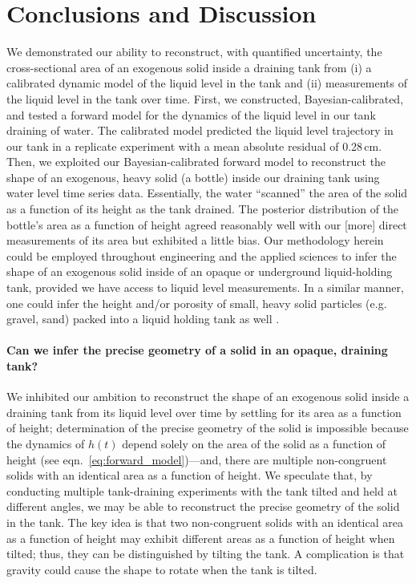 \documentclass[openacc]{rsproca_new}%
\begin{document}
\section{Conclusions and Discussion}
We demonstrated our ability to reconstruct, with quantified uncertainty, the cross-sectional area of an exogenous solid inside a draining tank from (i) a calibrated dynamic model of the liquid level in the tank and (ii) measurements of the liquid level in the tank over time.
First, we constructed, Bayesian-calibrated, and tested a forward model for the dynamics of the liquid level in our tank draining of water.
The calibrated model predicted the liquid level trajectory in our tank in a replicate experiment with a mean absolute residual of 0.28\,cm.
Then, we exploited our Bayesian-calibrated forward model to reconstruct the shape of an exogenous, heavy solid (a bottle) inside our draining tank using water level time series data. 
Essentially, the water ``scanned'' the area of the solid as a function of its height as the tank drained. 
The posterior distribution of the bottle's area as a function of height agreed reasonably well with our [more] direct measurements of its area but exhibited a little bias. 
Our methodology herein could be employed throughout engineering and the applied sciences to infer the shape of an exogenous solid inside of an opaque or underground \cite{gephart2010short} liquid-holding tank, provided we have access to liquid level measurements.
In a similar manner, one could infer the height and/or porosity of small, heavy solid particles (e.g. gravel, sand) packed into a liquid holding tank as well \cite{guellouz2020estimation}.

\paragraph{Can we infer the precise geometry of a solid in an opaque, draining tank?}
We inhibited our ambition to reconstruct the shape of an exogenous solid inside a draining tank from its liquid level over time by settling for its area as a function of height; determination of the precise geometry of the solid is impossible because the dynamics of $h(t)$ depend solely on the area of the solid as a function of height (see eqn.~\ref{eq:forward_model})---and, there are multiple non-congruent solids with an identical area as a function of height. We speculate that, by conducting multiple tank-draining experiments with the tank tilted and held at different angles, we may be able to reconstruct the precise geometry of the solid in the tank. The key idea is that two non-congruent solids with an identical area as a function of height may exhibit different areas as a function of height when tilted; thus, they can be distinguished by tilting the tank. A complication is that gravity could cause the shape to rotate when the tank is tilted. 
\end{document}

